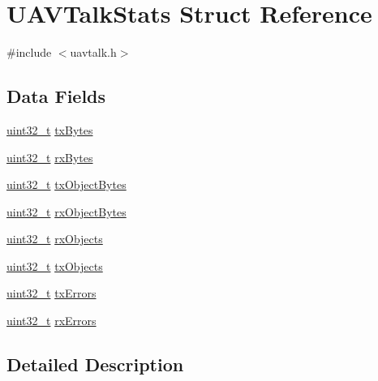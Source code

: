 \hypertarget{struct_u_a_v_talk_stats}{\section{U\-A\-V\-Talk\-Stats Struct Reference}
\label{struct_u_a_v_talk_stats}
}


{\ttfamily \#include $<$uavtalk.\-h$>$}

\subsection*{Data Fields}
\begin{DoxyCompactItemize}
\item 
\hyperlink{stdint_8h_a435d1572bf3f880d55459d9805097f62}{uint32\-\_\-t} \hyperlink{struct_u_a_v_talk_stats_a7d5a1c5d207383ebd5b62b27b78ec264}{tx\-Bytes}
\item 
\hyperlink{stdint_8h_a435d1572bf3f880d55459d9805097f62}{uint32\-\_\-t} \hyperlink{struct_u_a_v_talk_stats_af98fb7a9d72619f9ad84628b20ffcbdf}{rx\-Bytes}
\item 
\hyperlink{stdint_8h_a435d1572bf3f880d55459d9805097f62}{uint32\-\_\-t} \hyperlink{struct_u_a_v_talk_stats_ad2f1c1147e9062cfeaeaf21ea076434c}{tx\-Object\-Bytes}
\item 
\hyperlink{stdint_8h_a435d1572bf3f880d55459d9805097f62}{uint32\-\_\-t} \hyperlink{struct_u_a_v_talk_stats_a5adb8d84e7dfe9f3aa1a03a6c057f2fd}{rx\-Object\-Bytes}
\item 
\hyperlink{stdint_8h_a435d1572bf3f880d55459d9805097f62}{uint32\-\_\-t} \hyperlink{struct_u_a_v_talk_stats_abe87f216fd1bb8fdb474a61d467d7b41}{rx\-Objects}
\item 
\hyperlink{stdint_8h_a435d1572bf3f880d55459d9805097f62}{uint32\-\_\-t} \hyperlink{struct_u_a_v_talk_stats_a7f067b3f89c3ac3c274eb05f71557a6a}{tx\-Objects}
\item 
\hyperlink{stdint_8h_a435d1572bf3f880d55459d9805097f62}{uint32\-\_\-t} \hyperlink{struct_u_a_v_talk_stats_af325955ebac8f234145deefefdea9dbe}{tx\-Errors}
\item 
\hyperlink{stdint_8h_a435d1572bf3f880d55459d9805097f62}{uint32\-\_\-t} \hyperlink{struct_u_a_v_talk_stats_a0496877af8f1ce9110b2b42a58956e10}{rx\-Errors}
\end{DoxyCompactItemize}


\subsection{Detailed Description}


